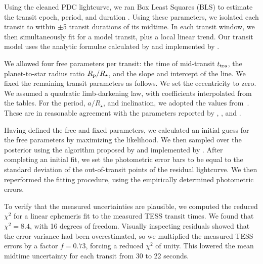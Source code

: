 \documentclass[12pt,twocolumn,tighten]{aastex62}
\begin{document}
Using the cleaned PDC lightcurve, we ran Box Least Squares (BLS) to
estimate the transit epoch, period, and duration
\citep{kovacs_box-fitting_2002}.  Using these parameters, we isolated
each transit to within $\pm$5 transit durations of its midtime.  In
each transit window, we then simultaneously fit for a model transit,
plus a local linear trend.  Our transit model uses the analytic
formulae calculated by \citet{mandel_analytic_2002} and implemented by
\citet{kreidberg_batman_2015}.

We allowed four free parameters per transit: the time of mid-transit
$t_{\rm tra}$, the planet-to-star radius ratio $R_{\rm p}/R_\star$,
and the slope and intercept of the line.
We fixed the remaining transit parameters as follows.  We set the
eccentricity to zero. We
assumed a quadratic limb-darkening law, with coefficients interpolated
from the \citet{claret_limb_2017} tables.  For the period,
$a/R_\star$, and inclination, we adopted the values
from~\citet{petrucci_no_2013}.  These are in reasonable agreement with
the parameters reported by \citet{gillon_improved_2009},
\citet{southworth_high-precision_2009}, and
\citet{huitson_gemini_2017}.

Having defined the free and fixed parameters, we calculated an initial
guess for the free parameters by maximizing the likelihood.  We then
sampled over the posterior using the algorithm proposed by
\citet{goodman_ensemble_2010} and implemented by
\citet{foreman-mackey_emcee_2013}.
After completing an initial fit, we set the photometric error bars to
be equal to the standard deviation of the out-of-transit points of the
residual lightcurve.  We then reperformed the fitting procedure, using
the empirically determined photometric errors.

To verify that the measured uncertainties are plausible, we computed
the reduced $\chi^2$ for a linear ephemeris fit to the measured TESS
transit times.  We found that $\chi^2 = 8.4$, with 16 degrees of
freedom.  Visually inspecting residuals showed that the error variance
had been overestimated, so we multiplied the measured TESS errors by a
factor $f=0.73$, forcing a reduced $\chi^2$ of unity.  This lowered
the mean midtime uncertainty for each transit from 30 to 22 seconds.
\end{document}
